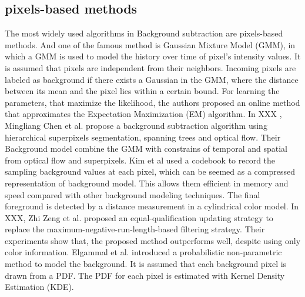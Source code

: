 \documentclass[runningheads,a4paper]{llncs}
\begin{document}
\subsection{pixels-based methods}
The most widely used algorithms in Background subtraction are pixels-based methods. And one of the famous method is Gaussian Mixture Model (GMM), in which a GMM is used to model the history over time of pixel’s intensity values. It is assumed that pixels are independent from their neighbors. Incoming pixels are labeled as background if there exists a Gaussian in the GMM, where the distance between its mean and the pixel lies within a certain bound. For learning the parameters, that maximize the likelihood, the authors proposed an online method that approximates the Expectation Maximization (EM) algorithm. 
In XXX , Mingliang Chen et al. propose a background subtraction algorithm using hierarchical superpixels segmentation, spanning trees and optical flow. Their Background model combine the GMM with constrains of temporal and spatial from optical flow and superpixels. 
Kim et al used a codebook to record the sampling background values at each pixel, which can be seemed as a compressed representation of background model. This allows them efficient in memory and speed compared with other background modeling techniques. The final foreground is detected by a distance measurement in a cylindrical color model.
In XXX, Zhi Zeng et al. proposed an equal-qualification updating strategy to replace the maximum-negative-run-length-based filtering strategy. Their experiments show that, the proposed method outperforms well, despite using only color information.
Elgammal et al. introduced a probabilistic non-parametric method to model the background. It is assumed that each background pixel is drawn from a PDF. The PDF for each pixel is estimated with Kernel Density Estimation (KDE).
\end{document}
